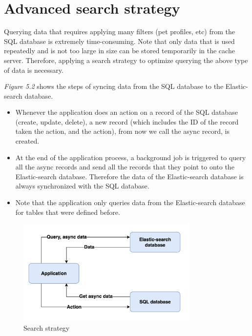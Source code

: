 \section{Advanced search strategy}

Querying data that requires applying many filters (pet profiles, etc)
from the SQL database is extremely time-consuming. Note that only data
that is used repeatedly and is not too large in size can be stored
temporarily in the cache server. Therefore, applying a search strategy
to optimize querying the above type of data is necessary.

\emph{Figure 5.2} shows the steps of syncing data from the SQL database
to the Elastic-search database.

\begin{itemize}
    \item
          Whenever the application does an action on a record of the SQL
          database (create, update, delete), a new record (which includes the ID
          of the record taken the action, and the action), from now we call the
          async record, is created.
    \item
          At the end of the application process, a background job is triggered
          to query all the async records and send all the records that they
          point to onto the Elastic-search database. Therefore the data of the
          Elastic-search database is always synchronized with the SQL database.
    \item
          Note that the application only queries data from the Elastic-search
          database for tables that were defined before.
\end{itemize}

\begin{figure}[H]
    \centering
    \includegraphics[width=0.8\textwidth]{Figures/search_strat.png}
    \caption{Search strategy}
\end{figure}

